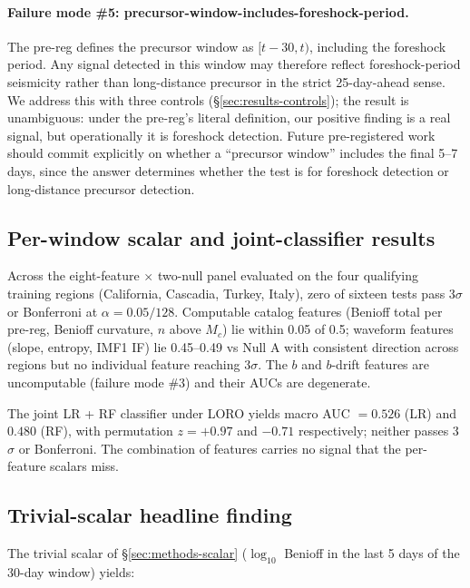 \documentclass[11pt]{article}
\begin{document}
\paragraph{Failure mode \#5: precursor-window-includes-foreshock-period.}
The pre-reg defines the precursor window as $[t-30, t)$, including the
foreshock period. Any signal detected in this window may therefore
reflect foreshock-period seismicity rather than long-distance precursor
in the strict 25-day-ahead sense. We address this with three controls
(\S\ref{sec:results-controls}); the result is unambiguous: under the
pre-reg's literal definition, our positive finding is a real signal,
but operationally it is foreshock detection. Future pre-registered work
should commit explicitly on whether a ``precursor window'' includes the
final 5--7 days, since the answer determines whether the test is for
foreshock detection or long-distance precursor detection.

\subsection{Per-window scalar and joint-classifier results}
\label{sec:results-scalar}

Across the eight-feature $\times$ two-null panel evaluated on the four
qualifying training regions (California, Cascadia, Turkey, Italy), zero
of sixteen tests pass 3$\sigma$ or Bonferroni at $\alpha = 0.05/128$.
Computable catalog features (Benioff total per pre-reg, Benioff
curvature, $n$ above $M_c$) lie within 0.05 of 0.5; waveform features
(slope, entropy, IMF1 IF) lie 0.45--0.49 vs Null A with consistent
direction across regions but no individual feature reaching 3$\sigma$.
The $b$ and $b$-drift features are uncomputable (failure mode \#3) and
their AUCs are degenerate.

The joint LR + RF classifier under LORO yields macro AUC $= 0.526$ (LR)
and $0.480$ (RF), with permutation $z = +0.97$ and $-0.71$
respectively; neither passes 3$\sigma$ or Bonferroni. The combination
of features carries no signal that the per-feature scalars miss.

\subsection{Trivial-scalar headline finding}
\label{sec:results-scalar-finding}

The trivial scalar of \S\ref{sec:methods-scalar} ($\log_{10}$ Benioff
in the last 5 days of the 30-day window) yields:
\end{document}
